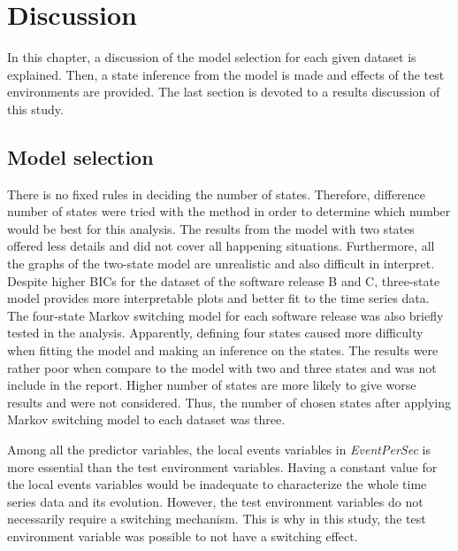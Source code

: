 
\lhead[\chaptername~\thechapter]{\rightmark}

\rhead[\leftmark]{}

\lfoot[\thepage]{}

\cfoot{}

\rfoot[]{\thepage}

\chapter{Discussion\label{chap:Discussion}}

In this chapter, a discussion of the model selection for each given
dataset is explained. Then, a state inference from the model is made
and effects of the test environments are provided. The last section
is devoted to a results discussion of this study.

\section{Model selection \label{subsec:Model-selection}}

There is no fixed rules in deciding the number of states. Therefore,
difference number of states were tried with the method in order to
determine which number would be best for this analysis. The results
from the model with two states offered less details and did not cover
all happening situations. Furthermore, all the graphs of the two-state
model are unrealistic and also difficult in interpret. Despite higher
BICs for the dataset of the software release B and C, three-state
model provides more interpretable plots and better fit to the time
series data. The four-state Markov switching model for each software
release was also briefly tested in the analysis. Apparently, defining
four states caused more difficulty when fitting the model and making
an inference on the states. The results were rather poor when compare
to the model with two and three states and was not include in the
report. Higher number of states are more likely to give worse results
and were not considered. Thus, the number of chosen states after applying
Markov switching model to each dataset was three. 

Among all the predictor variables, the local events variables in \emph{EventPerSec}
is more essential than the test environment variables. Having a constant
value for the local events variables would be inadequate to characterize
the whole time series data and its evolution. However, the test environment
variables do not necessarily require a switching mechanism. This is
why in this study, the test environment variable was possible to not
have a switching effect. %
\begin{comment}
In \ref{sec:Switching}, a hypothesis that the test environment variable
was possible to not have a switching effect was made. 

for each test case and should have flexible values in each of the
fixed number of state. Although these test environment variables affect
the CPU utilization, they do not need to have different values in
each state.
\end{comment}

